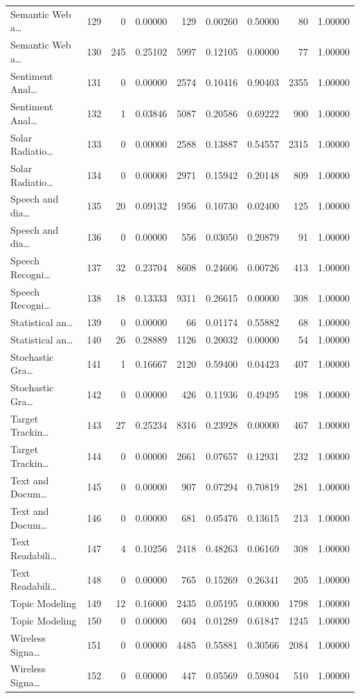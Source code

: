 \begin{table}
\begin{tabular}{lrrrrrrrr}
Semantic Web a… & 129 & 0 & 0.00000 & 129 & 0.00260 & 0.50000 & 80 & 1.00000 \\
Semantic Web a… & 130 & 245 & 0.25102 & 5997 & 0.12105 & 0.00000 & 77 & 1.00000 \\
Sentiment Anal… & 131 & 0 & 0.00000 & 2574 & 0.10416 & 0.90403 & 2355 & 1.00000 \\
Sentiment Anal… & 132 & 1 & 0.03846 & 5087 & 0.20586 & 0.69222 & 900 & 1.00000 \\
Solar Radiatio… & 133 & 0 & 0.00000 & 2588 & 0.13887 & 0.54557 & 2315 & 1.00000 \\
Solar Radiatio… & 134 & 0 & 0.00000 & 2971 & 0.15942 & 0.20148 & 809 & 1.00000 \\
Speech and dia… & 135 & 20 & 0.09132 & 1956 & 0.10730 & 0.02400 & 125 & 1.00000 \\
Speech and dia… & 136 & 0 & 0.00000 & 556 & 0.03050 & 0.20879 & 91 & 1.00000 \\
Speech Recogni… & 137 & 32 & 0.23704 & 8608 & 0.24606 & 0.00726 & 413 & 1.00000 \\
Speech Recogni… & 138 & 18 & 0.13333 & 9311 & 0.26615 & 0.00000 & 308 & 1.00000 \\
Statistical an… & 139 & 0 & 0.00000 & 66 & 0.01174 & 0.55882 & 68 & 1.00000 \\
Statistical an… & 140 & 26 & 0.28889 & 1126 & 0.20032 & 0.00000 & 54 & 1.00000 \\
Stochastic Gra… & 141 & 1 & 0.16667 & 2120 & 0.59400 & 0.04423 & 407 & 1.00000 \\
Stochastic Gra… & 142 & 0 & 0.00000 & 426 & 0.11936 & 0.49495 & 198 & 1.00000 \\
Target Trackin… & 143 & 27 & 0.25234 & 8316 & 0.23928 & 0.00000 & 467 & 1.00000 \\
Target Trackin… & 144 & 0 & 0.00000 & 2661 & 0.07657 & 0.12931 & 232 & 1.00000 \\
Text and Docum… & 145 & 0 & 0.00000 & 907 & 0.07294 & 0.70819 & 281 & 1.00000 \\
Text and Docum… & 146 & 0 & 0.00000 & 681 & 0.05476 & 0.13615 & 213 & 1.00000 \\
Text Readabili… & 147 & 4 & 0.10256 & 2418 & 0.48263 & 0.06169 & 308 & 1.00000 \\
Text Readabili… & 148 & 0 & 0.00000 & 765 & 0.15269 & 0.26341 & 205 & 1.00000 \\
Topic Modeling & 149 & 12 & 0.16000 & 2435 & 0.05195 & 0.00000 & 1798 & 1.00000 \\
Topic Modeling & 150 & 0 & 0.00000 & 604 & 0.01289 & 0.61847 & 1245 & 1.00000 \\
Wireless Signa… & 151 & 0 & 0.00000 & 4485 & 0.55881 & 0.30566 & 2084 & 1.00000 \\
Wireless Signa… & 152 & 0 & 0.00000 & 447 & 0.05569 & 0.59804 & 510 & 1.00000 \\
\bottomrule
\end{tabular}
\end{table}
